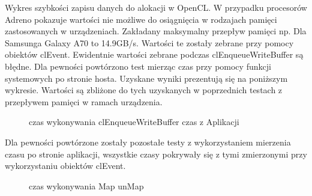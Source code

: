 Wykres szybkości zapisu danych do alokacji w OpenCL. W przypadku procesorów Adreno pokazuje wartości nie możliwe do osiągnięcia w rodzajach pamięci zastosowanych w urządzeniach. Zakładany maksymalny przepływ pamięci np. Dla Samsunga Galaxy A70 to 14.9GB/s. Wartości te zostały zebrane przy pomocy obiektów clEvent. Ewidentnie wartości zebrane podczas clEnqueueWriteBuffer są błędne. Dla pewności powtórzono test mierząc czas przy pomocy funkcji systemowych po stronie hosta. Uzyskane wyniki prezentują się na poniższym wykresie. Wartości są zbliżone do tych uzyskanych w poprzednich testach z przepływem pamięci w ramach urządzenia.
\begin{figure}[H]
\caption{czas wykonywania clEnqueueWriteBuffer czas z Aplikacji}
\end{figure} 

Dla pewności powtórzone zostały pozostałe testy z wykorzystaniem mierzenia czasu po stronie aplikacji, wszystkie czasy pokrywały się z tymi zmierzonymi przy wykorzystaniu obiektów clEvent.

\begin{figure}[H]
\caption{czas wykonywania Map unMap}
\end{figure}

